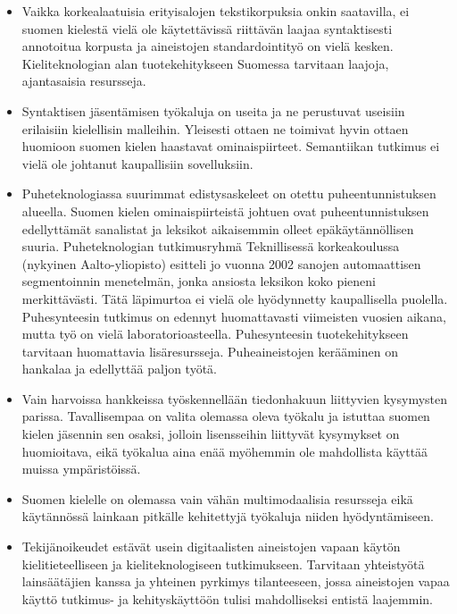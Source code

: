 \begin{multicols}{2}
\begin{itemize}
\item Vaikka korkealaatuisia erityisalojen tekstikorpuksia onkin
    saatavilla, ei suomen kielestä vielä ole käytettävissä riittävän
    laajaa syntaktisesti annotoitua korpusta ja aineistojen
    standardointityö on vielä kesken.  Kieliteknologian alan
    tuotekehitykseen Suomessa tarvitaan laajoja, ajantasaisia
    resursseja.

  \item Syntaktisen jäsentämisen työkaluja on useita ja ne perustuvat
    useisiin erilaisiin kielellisin malleihin. Yleisesti ottaen ne
    toimivat hyvin ottaen huomioon suomen kielen haastavat
    ominaispiirteet. Semantiikan tutkimus ei vielä ole johtanut
    kaupallisiin sovelluksiin.

  \item Puheteknologiassa suurimmat edistysaskeleet on otettu
    puheentunnistuksen alueella. Suomen kielen ominaispiirteistä
    johtuen ovat puheentunnistuksen edellyttämät sanalistat ja
    leksikot aikaisemmin olleet epäkäytännöllisen suuria.
    Puheteknologian tutkimusryhmä Teknillisessä korkeakoulussa
    (nykyinen Aalto-yliopisto) esitteli jo vuonna 2002 sanojen
    automaattisen segmentoinnin menetelmän, jonka ansiosta leksikon
    koko pieneni merkittävästi. Tätä läpimurtoa ei vielä ole
    hyödynnetty kaupallisella puolella. Puhesynteesin tutkimus on
    edennyt huomattavasti viimeisten vuosien aikana, mutta työ on
    vielä laboratorioasteella. Puhesynteesin tuotekehitykseen
    tarvitaan huomattavia lisäresursseja. Puheaineistojen kerääminen
    on hankalaa ja edellyttää paljon työtä.

\item Vain harvoissa hankkeissa työskennellään tiedonhakuun liittyvien
    kysymysten parissa. Tavallisempaa on valita olemassa oleva työkalu
    ja istuttaa suomen kielen jäsennin sen osaksi, jolloin
    lisensseihin liittyvät kysymykset on huomioitava, eikä työkalua
    aina enää myöhemmin ole mahdollista käyttää muissa ympäristöissä.

\item Suomen kielelle on olemassa vain vähän multimodaalisia
    resursseja eikä käytännössä lainkaan pitkälle kehitettyjä
    työkaluja niiden hyödyntämiseen.

\item Tekijänoikeudet estävät usein digitaalisten aineistojen vapaan
    käytön kielitieteelliseen ja kieliteknologiseen
    tutkimukseen. Tarvitaan yhteistyötä lainsäätäjien kanssa ja
    yhteinen pyrkimys tilanteeseen, jossa aineistojen vapaa käyttö
    tutkimus- ja kehityskäyttöön tulisi mahdolliseksi entistä
    laajemmin.
\end{itemize}


\end{multicols}
